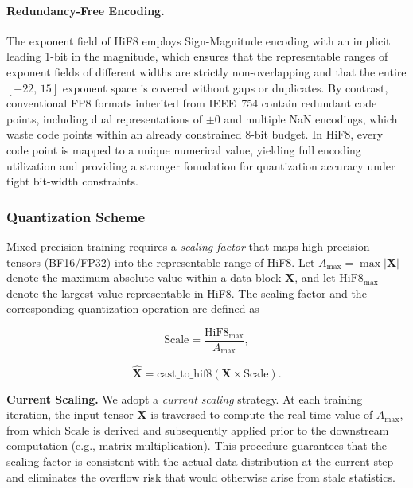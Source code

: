 \paragraph{Redundancy-Free Encoding.}
The exponent field of HiF8 employs Sign-Magnitude encoding with an implicit
leading 1-bit in the magnitude, which ensures that the representable ranges of
exponent fields of different widths are strictly non-overlapping and that the
entire $[-22,\,15]$ exponent space is covered without gaps or duplicates.
By contrast, conventional FP8 formats inherited from IEEE~754 contain redundant
code points, including dual representations of $\pm 0$ and multiple NaN encodings,
which waste code points within an already constrained 8-bit budget.
In HiF8, every code point is mapped to a unique numerical value, yielding full
encoding utilization and providing a stronger foundation for quantization accuracy
under tight bit-width constraints.

\subsubsection{Quantization Scheme}

Mixed-precision training requires a \emph{scaling factor} that maps
high-precision tensors (BF16/FP32) into the representable range of HiF8.
Let $A_{\max} = \max|\mathbf{X}|$ denote the maximum absolute value within a
data block $\mathbf{X}$, and let $\mathrm{HiF8}_{\max}$ denote the largest
value representable in HiF8.
The scaling factor and the corresponding quantization operation are defined as

\begin{equation}
  \mathrm{Scale} = \frac{\mathrm{HiF8}_{\max}}{A_{\max}},
  \label{eq:hif8_scale}
\end{equation}

\begin{equation}
  \hat{\mathbf{X}} = \mathrm{cast\_to\_hif8}\!\left(\mathbf{X} \times \mathrm{Scale}\right).
  \label{eq:hif8_quant}
\end{equation}

\noindent\textbf{Current Scaling.}
We adopt a \emph{current scaling} strategy.
At each training iteration, the input tensor $\mathbf{X}$ is traversed to compute
the real-time value of $A_{\max}$, from which $\mathrm{Scale}$ is derived and
subsequently applied prior to the downstream computation (e.g., matrix multiplication).
This procedure guarantees that the scaling factor is consistent with the actual
data distribution at the current step and eliminates the overflow risk that would
otherwise arise from stale statistics.

